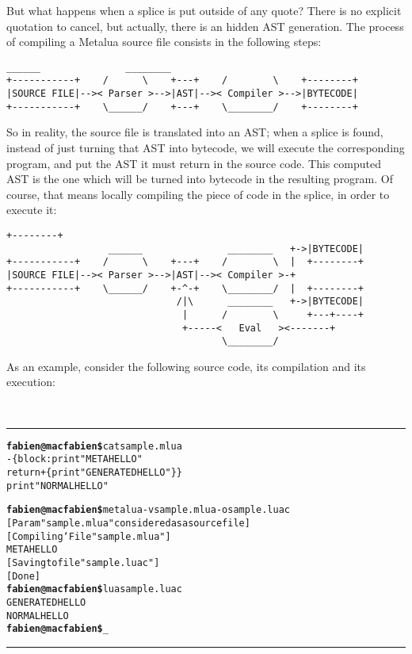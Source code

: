 But what happens when a splice is put outside of any quote? There is
no explicit quotation to cancel, but actually, there is an hidden AST
generation. The process of compiling a Metalua source file consists in
the following steps:

\begin{Verbatim}[fontsize=\scriptsize]
                  ______               ________
+-----------+    /      \    +---+    /        \    +--------+
|SOURCE FILE|-->< Parser >-->|AST|-->< Compiler >-->|BYTECODE|  
+-----------+    \______/    +---+    \________/    +--------+

\end{Verbatim}

So in reality, the source file is translated into an AST; when a
splice is found, instead of just turning that AST into bytecode, we
will execute the corresponding program, and put the AST it must return
in the source code. This computed AST is the one which will be turned
into bytecode in the resulting program. Of course, that means locally
compiling the piece of code in the splice, in order to execute it:

\begin{Verbatim}[fontsize=\scriptsize]
                                                     +--------+
                  ______               ________   +->|BYTECODE|  
+-----------+    /      \    +---+    /        \  |  +--------+
|SOURCE FILE|-->< Parser >-->|AST|-->< Compiler >-+
+-----------+    \______/    +-^-+    \________/  |  +--------+
                              /|\      ________   +->|BYTECODE|  
                               |      /        \     +---+----+
                               +-----<   Eval   ><-------+
                                      \________/
\end{Verbatim}

As an example, consider the following source code, its compilation and
its execution:

\def\braces#1{\{#1\}}
~\\\hrule
\begin{alltt}
{\bf{}fabien@macfabien\$} cat sample.mlua
-\braces{block: print "META HELLO"
         return +\braces{ print "GENERATED HELLO" } }
print "NORMAL HELLO"

{\bf{}fabien@macfabien\$} metalua -v sample.mlua -o sample.luac
[ Param "sample.mlua" considered as a source file ]
[ Compiling `File "sample.mlua" ]
META HELLO
[ Saving to file "sample.luac" ]
[ Done ]
{\bf{}fabien@macfabien\$} lua sample.luac
GENERATED HELLO
NORMAL HELLO
{\bf{}fabien@macfabien\$} _
\end{alltt}
\hrule~\\

